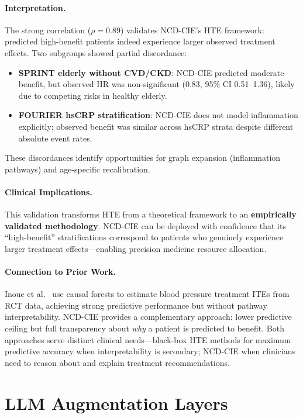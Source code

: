 \documentclass[runningheads]{llncs}
\begin{document}
\paragraph{Interpretation.}
The strong correlation ($\rho = 0.89$) validates NCD-CIE's HTE
framework: predicted high-benefit patients indeed experience larger
observed treatment effects.
Two subgroups showed partial discordance:
\begin{itemize}
\item \textbf{SPRINT elderly without CVD/CKD}: NCD-CIE predicted
  moderate benefit, but observed HR was non-significant (0.83,
  95\% CI 0.51--1.36), likely due to competing risks in healthy
  elderly.
\item \textbf{FOURIER hsCRP stratification}: NCD-CIE does not
  model inflammation explicitly; observed benefit was similar
  across hsCRP strata despite different absolute event rates.
\end{itemize}
These discordances identify opportunities for graph expansion
(inflammation pathways) and age-specific recalibration.

\paragraph{Clinical Implications.}
This validation transforms HTE from a theoretical framework to an
\textbf{empirically validated methodology}.
NCD-CIE can be deployed with confidence that its ``high-benefit''
stratifications correspond to patients who genuinely experience
larger treatment effects---enabling precision medicine resource
allocation.

\paragraph{Connection to Prior Work.}
Inoue et al.~\cite{inoue2023causalforest} use causal forests to
estimate blood pressure treatment ITEs from RCT data, achieving
strong predictive performance but without pathway interpretability.
NCD-CIE provides a complementary approach: lower predictive
ceiling but full transparency about \emph{why} a patient is
predicted to benefit.
Both approaches serve distinct clinical needs---black-box HTE
methods for maximum predictive accuracy when interpretability is
secondary; NCD-CIE when clinicians need to reason about and
explain treatment recommendations.

\section{LLM Augmentation Layers}\label{sec:llm}
\end{document}
